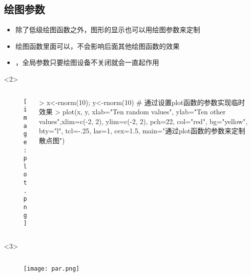 \subsection{绘图参数}
\begin{frame}[t, fragile]{\subsecname}{}
\begin{itemize}
\item<1-> 除了低级绘图函数之外，图形的显示也可以用绘图参数来定制
\item<2-> 绘图函数里面可以，不会影响后面其他绘图函数的效果
\item<3-> ，全局参数只要绘图设备不关闭就会一直起作用
\end{itemize}

\begin{overlayarea}{\textwidth}{\textheight}
\begin{onlyenv}<2>
\begin{columns}
        \begin{column}{.4\textwidth}
          \begin{figure}
            \centering
            \texttt{[image: plot.png]}
          \end{figure}
        \end{column}

        \begin{column}{.6\textwidth}
 \centering
\begin{rcode}
> x<-rnorm(10); y<-rnorm(10)
# 通过设置plot函数的参数实现临时效果
> plot(x, y, xlab="Ten random values", ylab="Ten other values",xlim=c(-2, 2), ylim=c(-2, 2), pch=22, col="red", bg="yellow", bty="l", tcl=-.25, las=1, cex=1.5, main="通过plot函数的参数来定制散点图")
\end{rcode}
        \end{column}
      \end{columns}
\end{onlyenv}

\begin{onlyenv}<3>
\begin{columns}
        \begin{column}{.4\textwidth}
          \begin{figure}
            \centering
            \texttt{[image: par.png]}
          \end{figure}
        \end{column}


\end{columns}
\end{onlyenv}
\end{overlayarea}
\end{frame}
